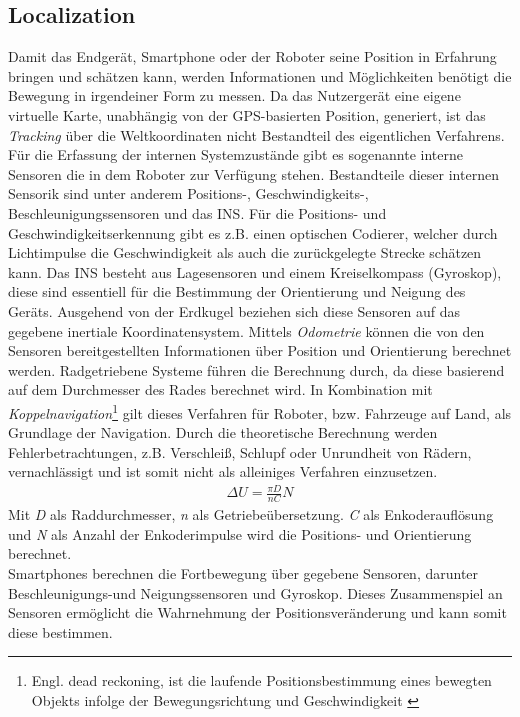 \subsection{Localization}
Damit das Endgerät, Smartphone oder der Roboter seine Position in Erfahrung bringen und schätzen kann, werden Informationen und Möglichkeiten 
benötigt die Bewegung in irgendeiner Form zu messen. Da das Nutzergerät eine eigene virtuelle Karte, unabhängig von der \acs{GPS}-basierten 
Position, generiert, ist das \textit{Tracking} über die Weltkoordinaten nicht Bestandteil des eigentlichen Verfahrens. Für die Erfassung der 
internen Systemzustände gibt es sogenannte interne Sensoren die in dem Roboter zur Verfügung stehen. Bestandteile dieser internen 
Sensorik sind unter anderem Positions-, Geschwindigkeits-, Beschleunigungssensoren und das \acl{INS}. Für die Positions- und 
Geschwindigkeitserkennung gibt es z.B. einen optischen Codierer, welcher durch Lichtimpulse die Geschwindigkeit als auch die zurückgelegte 
Strecke schätzen kann. Das \acs{INS} besteht aus Lagesensoren und einem Kreiselkompass (Gyroskop), diese sind essentiell für die Bestimmung 
der Orientierung und Neigung des Geräts. Ausgehend von der Erdkugel beziehen sich diese Sensoren auf das gegebene inertiale Koordinatensystem.
Mittels \textit{Odometrie} können die von den Sensoren bereitgestellten Informationen über Position und Orientierung berechnet werden. Radgetriebene 
Systeme führen die Berechnung durch, da diese basierend auf dem Durchmesser des Rades berechnet wird. In Kombination mit \textit{Koppelnavigation}\footnote{Engl. dead reckoning, ist die laufende Positionsbestimmung eines bewegten Objekts infolge der Bewegungsrichtung und Geschwindigkeit \cite{koppelnavigation.2019j}}
gilt dieses Verfahren für Roboter, bzw. Fahrzeuge auf Land, als Grundlage der Navigation. Durch die theoretische Berechnung werden 
Fehlerbetrachtungen, z.B. Verschleiß, Schlupf oder Unrundheit von Rädern, vernachlässigt und ist somit nicht als alleiniges Verfahren einzusetzen. 
\begin{align*}
    \Delta U = \frac{\pi D}{\textit{n}C}N
\end{align*}
Mit \textit{D} als Raddurchmesser, \textit{n} als Getriebeübersetzung. \textit{C} als Enkoderauflösung und \textit{N} als Anzahl der 
Enkoderimpulse wird die Positions- und Orientierung berechnet. 
\\ 
Smartphones berechnen die Fortbewegung über gegebene Sensoren, darunter Beschleunigungs-und Neigungssensoren und Gyroskop. Dieses Zusammenspiel an 
Sensoren ermöglicht die Wahrnehmung der Positionsveränderung und kann somit diese bestimmen.
